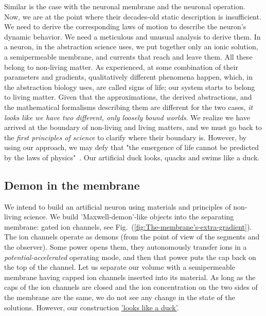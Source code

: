 Similar is the case with the neuronal membrane and the neuronal operation.
Now, we are at the point where their decades-old static description
is insufficient. We need
to derive the corresponding laws of motion to describe the neuron's dynamic behavior. We need a meticulous and
unusual analysis to derive them. 
%
In a neuron, in the abstraction science uses, we put together only
an ionic solution, a semipermeable membrane, and currents that reach and leave
them. All these belong to non-living matter.
As experienced, at some combination of their parameters and gradients, qualitatively
different phenomena happen, which, in the abstraction biology uses,
are called \hypertarget{SignsOfLife}{signs of life};
our system starts to belong to living matter.
Given that the approximations, the derived abstractions,
and the mathematical formalisms describing them are different for
the two cases, \emph{it looks like we have two different, only loosely
bound worlds}. We realize we have arrived at the boundary of non-living
and living matters, and we must go back to the \emph{first principles
of science} to clarify where their boundary is. However, by using our approach, we may defy that "the
emergence of life cannot be predicted by the laws of physics"~\cite{ConservationOfInformation:2021}.
Our artificial duck looks, quacks and swims like a duck. 




\subsection{Demon in the membrane\label{sec:Demon-in-the-membrane}}


We intend to build an artificial neuron using materials and principles of non-living science.
We build '\hypertarget{Maxwell-demon}{Maxwell-demon}'-like objects into the separating membrane:
gated ion channels, see Fig.~(\ref{fig:The-membrane's-extra-gradient}). 
The ion channels operate as demons (from the point of view of the segments
and the observer).
Some power opens them, they autonomously transfer ions
in a \emph{potential-accelerated} operating mode, and then that power
puts the cap back on the top of the channel.
Let us separate our volume with a semipermeable membrane  having capped ion channels inserted into its material. 
As long as the caps of the ion channels are closed 
and the ion concentration on the two sides of the membrane are the same, we do not see any change in the state of the solutions. 
However, our construction \href{https://en.wikipedia.org/wiki/Duck_test}{'looks like a duck'}.

